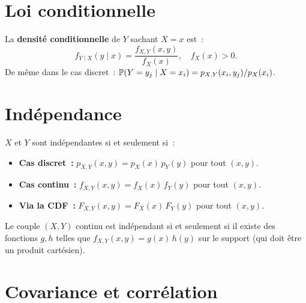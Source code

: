 \section{Loi conditionnelle}

\begin{definition}
La \textbf{densit\'e conditionnelle} de $Y$ sachant $X = x$ est~:
\[
    f_{Y \mid X}(y \mid x) = \frac{f_{X,Y}(x, y)}{f_X(x)}, \quad f_X(x) > 0.
\]
De m\^eme dans le cas discret~: $\mathbb{P}(Y = y_j \mid X = x_i) = p_{X,Y}(x_i, y_j)/p_X(x_i)$.
\end{definition}

\section{Ind\'ependance}

\begin{theoreme}
$X$ et $Y$ sont ind\'ependantes si et seulement si~:
\begin{itemize}
    \item \textbf{Cas discret~:} $p_{X,Y}(x,y) = p_X(x)\, p_Y(y)$ pour tout $(x,y)$.
    \item \textbf{Cas continu~:} $f_{X,Y}(x,y) = f_X(x)\, f_Y(y)$ pour tout $(x,y)$.
    \item \textbf{Via la CDF~:} $F_{X,Y}(x,y) = F_X(x)\, F_Y(y)$ pour tout $(x,y)$.
\end{itemize}
\end{theoreme}

\begin{proposition}
Le couple $(X,Y)$ continu est ind\'ependant si et seulement si il existe des
fonctions $g, h$ telles que $f_{X,Y}(x,y) = g(x)\, h(y)$ sur le support (qui
doit \^etre un produit cart\'esien).
\end{proposition}

\section{Covariance et corr\'elation}

